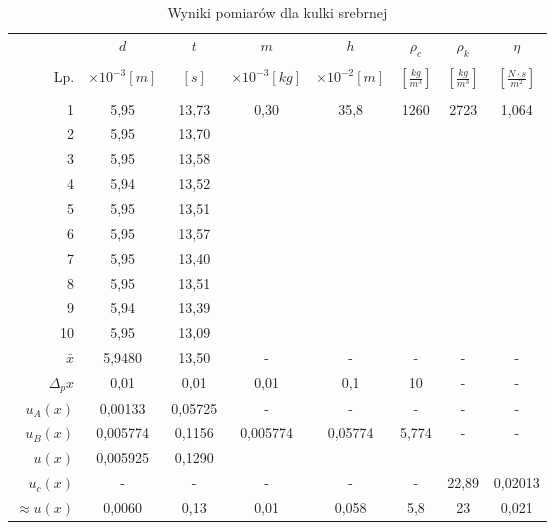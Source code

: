 \documentclass[polish, 11pt, a4paper]{article}
\begin{document}
		\begin{table}[H]
			\centering
			\caption{Wyniki pomiarów dla kulki srebrnej}
			\begin{tabular}{|r|c|c|c|c|c|c|c|} \hline
				&	\(d\)	&	\(t\)	&	\(m\)	&	\(h\)	&	\(\rho_c\)	&	\(\rho_k\)	&	\(\eta\)	\\
				&&&&&&& \\[-1em]
				
				Lp.	&	\(\times{10^{-3} [m]}\)	&	\([s]\)	&	\(\times{10^{-3} [kg]}\)	&	\(\times{10^{-2} [m]}\)	&	\(\left[\frac{kg}{m^3}\right]\)	&	\(\left[\frac{kg}{m^3}\right]\)	&	\(\left[\frac{N\cdot s}{m^2}\right]\)	\\
				&&&&&&& \\[-1em]
				\hline
				1	&	5,95	&	13,73	&	\multirow{10}{*}{0,30}	&	\multirow{10}{*}{35,8}	&	\multirow{10}{*}{1260}	&	\multirow{10}{*}{2723}	&	\multirow{10}{*}{1,064}	\\\cline{1-3}
				2	&	5,95	&	13,70	&		&		&		&		&		\\\cline{1-3}
				3	&	5,95	&	13,58	&		&		&		&		&		\\\cline{1-3}
				4	&	5,94	&	13,52	&		&		&		&		&		\\\cline{1-3}
				5	&	5,95	&	13,51	&		&		&		&		&		\\\cline{1-3}
				6	&	5,95	&	13,57	&		&		&		&		&		\\\cline{1-3}
				7	&	5,95	&	13,40	&		&		&		&		&		\\\cline{1-3}
				8	&	5,95	&	13,51	&		&		&		&		&		\\\cline{1-3}
				9	&	5,94	&	13,39	&		&		&		&		&		\\\cline{1-3}
				10	&	5,95	&	13,09	&		&		&		&		&		\\\hline
				\(\bar{x}\)	&	5,9480	&	13,50	&	-	&	-	&	-	&	-	&	-	\\\hline
				\(\Delta{_px}\)	&	0,01	&	0,01	&	0,01	&	0,1	&	10	&	-	&	-	\\\hline
				\(u_A(x)\)	&	0,00133	&	0,05725	&	-	&	-	&	-	&	-	&	-	\\\hline
				\(u_B(x)\)	&	0,005774	&	0,1156	&	\multirow{2}{*}{0,005774}	&	\multirow{2}{*}{0,05774}	&	\multirow{2}{*}{5,774}	&	\multirow{2}{*}{-}	&	\multirow{2}{*}{-}	\\\cline{1-3}
				\(u(x)\)	&	0,005925	&	0,1290	&		&		&		&		&		\\\hline
				\(u_c(x)\)	&	-	&	-	&	-	&	-	&	-	&	22,89	&	0,02013	\\\hline
				\(\approx{u(x)}\)	&	0,0060	&	0,13	&	0,01	&	0,058	&	5,8	&	23	&	0,021	\\\hline
			\end{tabular}
		\end{table}
	
\end{document}

